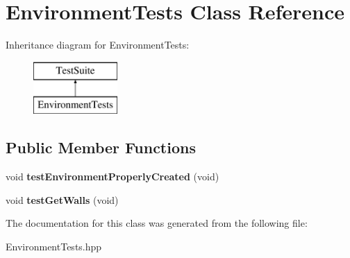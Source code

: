 \hypertarget{classEnvironmentTests}{\section{Environment\-Tests Class Reference}
\label{classEnvironmentTests}
}
Inheritance diagram for Environment\-Tests\-:\begin{figure}[H]
\begin{center}
\leavevmode
\includegraphics[height=2.000000cm]{classEnvironmentTests}
\end{center}
\end{figure}
\subsection*{Public Member Functions}
\begin{DoxyCompactItemize}
\item 
\hypertarget{classEnvironmentTests_a9899e88cc8aadbce38f3dda949d86cf7}{void {\bfseries test\-Environment\-Properly\-Created} (void)}\label{classEnvironmentTests_a9899e88cc8aadbce38f3dda949d86cf7}

\item 
\hypertarget{classEnvironmentTests_aa467224377550c73dcf88b383bb03c13}{void {\bfseries test\-Get\-Walls} (void)}\label{classEnvironmentTests_aa467224377550c73dcf88b383bb03c13}

\end{DoxyCompactItemize}


The documentation for this class was generated from the following file\-:\begin{DoxyCompactItemize}
\item 
Environment\-Tests.\-hpp\end{DoxyCompactItemize}
